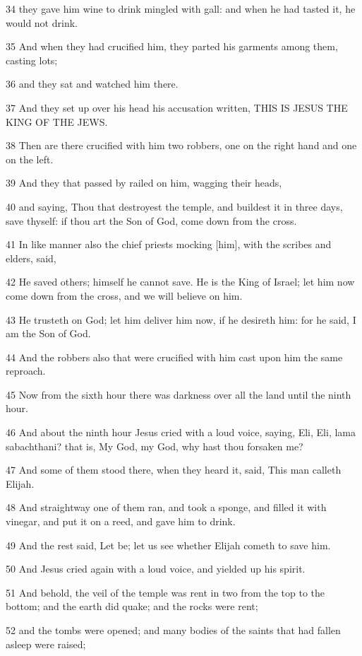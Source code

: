 \par 34 they gave him wine to drink mingled with gall: and when he had tasted it, he would not drink.
\par 35 And when they had crucified him, they parted his garments among them, casting lots;
\par 36 and they sat and watched him there.
\par 37 And they set up over his head his accusation written, THIS IS JESUS THE KING OF THE JEWS.
\par 38 Then are there crucified with him two robbers, one on the right hand and one on the left.
\par 39 And they that passed by railed on him, wagging their heads,
\par 40 and saying, Thou that destroyest the temple, and buildest it in three days, save thyself: if thou art the Son of God, come down from the cross.
\par 41 In like manner also the chief priests mocking [him], with the scribes and elders, said,
\par 42 He saved others; himself he cannot save. He is the King of Israel; let him now come down from the cross, and we will believe on him.
\par 43 He trusteth on God; let him deliver him now, if he desireth him: for he said, I am the Son of God.
\par 44 And the robbers also that were crucified with him cast upon him the same reproach.
\par 45 Now from the sixth hour there was darkness over all the land until the ninth hour.
\par 46 And about the ninth hour Jesus cried with a loud voice, saying, Eli, Eli, lama sabachthani? that is, My God, my God, why hast thou forsaken me?
\par 47 And some of them stood there, when they heard it, said, This man calleth Elijah.
\par 48 And straightway one of them ran, and took a sponge, and filled it with vinegar, and put it on a reed, and gave him to drink.
\par 49 And the rest said, Let be; let us see whether Elijah cometh to save him.
\par 50 And Jesus cried again with a loud voice, and yielded up his spirit.
\par 51 And behold, the veil of the temple was rent in two from the top to the bottom; and the earth did quake; and the rocks were rent;
\par 52 and the tombs were opened; and many bodies of the saints that had fallen asleep were raised;
